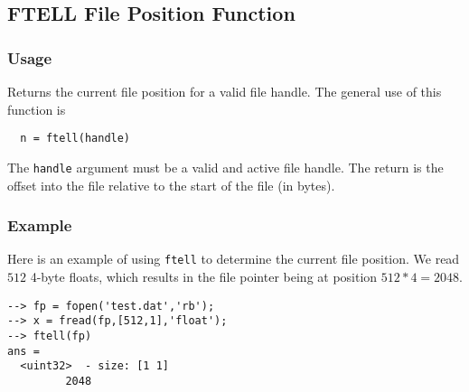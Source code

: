 %
%
%
\subsection{FTELL File Position Function}
\subsubsection{Usage}
Returns the current file position for a valid file handle.
The general use of this function is
\begin{verbatim}
  n = ftell(handle)
\end{verbatim}
The \verb|handle| argument must be a valid and active file handle.  The
return is the offset into the file relative to the start of the
file (in bytes).
\subsubsection{Example}
Here is an example of using \verb|ftell| to determine the current file position.  We read $512$ 4-byte floats, which results in the file pointer being at position $512*4 = 2048$.
\begin{verbatim}
--> fp = fopen('test.dat','rb');
--> x = fread(fp,[512,1],'float');
--> ftell(fp)
ans =
  <uint32>  - size: [1 1]
         2048
\end{verbatim}
